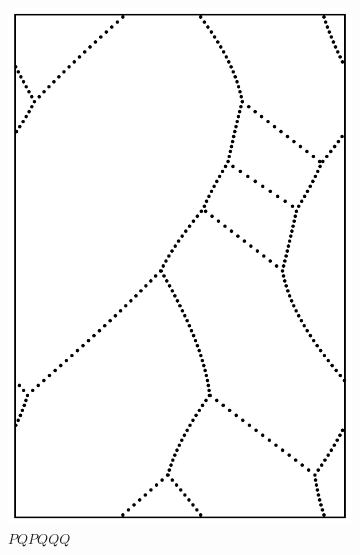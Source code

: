 \documentclass[12pt,twoside]{reedthesis}
\theoremstyle{definition}
\begin{document}
\begin{figure}[h]
\begin{subfigure}[t]{0.24\textwidth}
    \includegraphics[width=\textwidth]{figures/string_cheese_appendix/pqpqqq.pdf}
    \caption*{$PQPQQQ$}
    \vspace{5mm}
  \end{subfigure}
  \hfill
  \begin{subfigure}[t]{0.24\textwidth}

\end{subfigure}
\end{figure}
\end{document}
